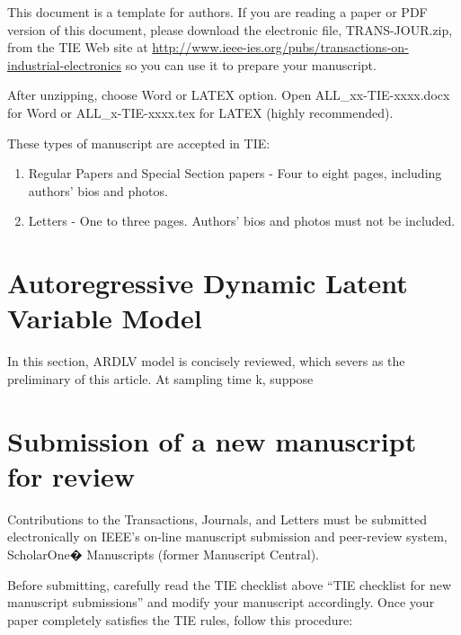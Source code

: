 \documentclass[journal]{IEEEtranTICPS}
\begin{document}
{T}{his} document is a template for authors. If you are reading a paper or PDF version of this document, please download the electronic file, TRANS-JOUR.zip, from the TIE Web site at \url{http://www.ieee-ies.org/pubs/transactions-on-industrial-electronics} so you can use it to prepare your manuscript.

After unzipping, choose Word or LATEX option. Open ALL\_xx-TIE-xxxx.docx for Word or ALL\_x-TIE-xxxx.tex for LATEX (highly recommended).

These types of manuscript are accepted in TIE:


\begin{enumerate}[1)]
	\item Regular Papers and Special Section papers - Four to eight pages, including authors' bios and photos.
	\item Letters - One to three pages. Authors' bios and photos must not be included.
\end{enumerate}

\section{Autoregressive Dynamic Latent Variable Model}
In this section, ARDLV model is concisely reviewed, which severs as the preliminary of this article. At sampling time k, suppose

\section{Submission of a new manuscript for review}

Contributions to the Transactions, Journals, and Letters must be submitted electronically on IEEE's on-line manuscript submission and peer-review system, ScholarOne� Manuscripts (former Manuscript Central).

Before submitting, carefully read the TIE checklist above ``TIE checklist for new manuscript submissions'' and modify your manuscript accordingly. Once your paper completely satisfies the TIE rules, follow this procedure:
\end{document}
